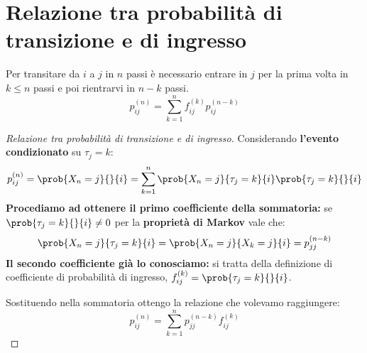 \documentclass[\main/main.tex]{subfiles}
\begin{document}
\section{Relazione tra probabilità di transizione e di ingresso}
\begin{theorem}
  Per transitare da \(i\) a \(j\) in \(n\) passi è necessario entrare in \(j\) per la prima volta in \(k\leq n\) passi e poi rientrarvi in \(n-k\) passi.
  \[
    p^{(n)}_{ij} = \sum_{k=1}^n f^{(k)}_{ij}p^{(n-k)}_{ij}
  \]
\end{theorem}
\begin{proof}[Relazione tra probabilità di transizione e di ingresso]
  Considerando \textbf{l'evento condizionato} su \(\tau_j = k\):
  \[
    p^{(n)}_{ij} = \prob{X_n = j}{}{i} = \sum_{k=1}^{n} \prob{X_n = j}{\tau_j=k}{i}\prob{\tau_j=k}{}{i}
  \]
  \textbf{Procediamo ad ottenere il primo coefficiente della sommatoria:} se \(\prob{\tau_j=k}{}{i} \neq 0\) per la \textbf{proprietà di Markov} vale che:
  \[
    \prob{X_n = j}{\tau_j=k}{i} = \prob{X_n = j}{X_k = j}{i} = p^{(n-k)}_{jj}
  \]
  \textbf{Il secondo coefficiente già lo conosciamo:} si tratta della definizione di coefficiente di probabilità di ingresso, \(f^{(k)}_{ij}  = \prob{\tau_j=k}{}{i}\).

  Sostituendo nella sommatoria ottengo la relazione che volevamo raggiungere:
  \[
    p^{(n)}_{ij} = \sum_{k=1}^{n} p^{(n-k)}_{jj}f^{(k)}_{ij}
  \]
\end{proof}
\end{document}
